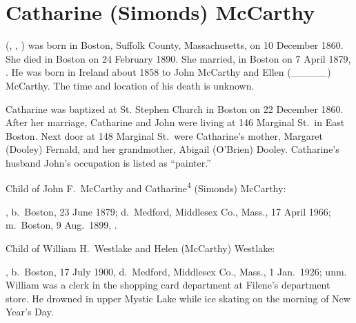 \section{Catharine (Simonds) McCarthy}

 (, , ) was born in Boston, Suffolk County, Massachusetts, on 10 December 1860.\cite{Catharine4SimondsBirth} She died in Boston on 24 February 1890.\cite{Catharine4SimondsDeath} She married, in Boston on 7 April 1879, .\cite{JohnMcCarthyMarriage} He was born in Ireland about 1858 to John McCarthy and Ellen (\_\_\_\_\_) McCarthy.\cite{JohnMcCarthyMarriage} The time and location of his death is unknown.

Catharine was baptized at St. Stephen Church in Boston on 22 December 1860.\cite{Catharine4SimondsBaptism} After her marriage, Catharine and John were living at 146 Marginal St.\ in East Boston. Next door at 148 Marginal St.\ were Catharine's mother, Margaret (Dooley) Fernald, and her grandmother, Abigail (O'Brien) Dooley. Catharine's husband John's occupation is listed as ``painter.''\cite{Census1880Catharine4Simonds}

\begin{KidsIntro}
	Child of John F.\ McCarthy and Catharine\textsuperscript{4} (Simonds) McCarthy:
\end{KidsIntro}

\begin{Kids}
	, b.\ Boston, 23 June 1879;\cite{Helen5McCarthyBirth} d.\ Medford, Middlesex Co., Mass., 17 April 1966;\cite{Helen5McCarthyDeath} m.\ Boston, 9 Aug.\ 1899, .\cite{Helen5McCarthyMarriage}

\begin{GrandkidsIntro}
	Child of William H.\ Westlake and Helen (McCarthy) Westlake:
\end{GrandkidsIntro}

\begin{Grandkids}		
	, b.\ Boston, 17 July 1900,\cite{William5WestlakeBirth} d.\ Medford, Middlesex Co., Mass., 1 Jan.\ 1926; unm.\cite{William5WestlakeDeath} William was a clerk in the shopping card department at Filene's department store. He drowned in upper Mystic Lake while ice skating on the morning of New Year's Day.\cite{William5WestlakeDeath}
\end{Grandkids}

\end{Kids}



